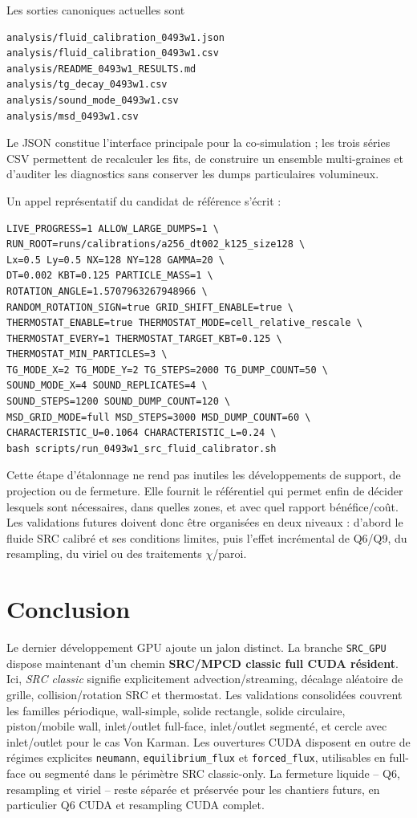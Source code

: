 \documentclass[11pt,a4paper]{article}
\begin{document}
Les sorties canoniques actuelles sont
\begin{verbatim}
analysis/fluid_calibration_0493w1.json
analysis/fluid_calibration_0493w1.csv
analysis/README_0493w1_RESULTS.md
analysis/tg_decay_0493w1.csv
analysis/sound_mode_0493w1.csv
analysis/msd_0493w1.csv
\end{verbatim}
Le JSON constitue l'interface principale pour la co-simulation ; les trois séries CSV permettent de recalculer les fits, de construire un ensemble multi-graines et d'auditer les diagnostics sans conserver les dumps particulaires volumineux.

Un appel représentatif du candidat de référence s'écrit :
\begin{verbatim}
LIVE_PROGRESS=1 ALLOW_LARGE_DUMPS=1 \
RUN_ROOT=runs/calibrations/a256_dt002_k125_size128 \
Lx=0.5 Ly=0.5 NX=128 NY=128 GAMMA=20 \
DT=0.002 KBT=0.125 PARTICLE_MASS=1 \
ROTATION_ANGLE=1.5707963267948966 \
RANDOM_ROTATION_SIGN=true GRID_SHIFT_ENABLE=true \
THERMOSTAT_ENABLE=true THERMOSTAT_MODE=cell_relative_rescale \
THERMOSTAT_EVERY=1 THERMOSTAT_TARGET_KBT=0.125 \
THERMOSTAT_MIN_PARTICLES=3 \
TG_MODE_X=2 TG_MODE_Y=2 TG_STEPS=2000 TG_DUMP_COUNT=50 \
SOUND_MODE_X=4 SOUND_REPLICATES=4 \
SOUND_STEPS=1200 SOUND_DUMP_COUNT=120 \
MSD_GRID_MODE=full MSD_STEPS=3000 MSD_DUMP_COUNT=60 \
CHARACTERISTIC_U=0.1064 CHARACTERISTIC_L=0.24 \
bash scripts/run_0493w1_src_fluid_calibrator.sh
\end{verbatim}

Cette étape d'étalonnage ne rend pas inutiles les développements de support, de projection ou de fermeture. Elle fournit le référentiel qui permet enfin de décider lesquels sont nécessaires, dans quelles zones, et avec quel rapport bénéfice/coût. Les validations futures doivent donc être organisées en deux niveaux : d'abord le fluide SRC calibré et ses conditions limites, puis l'effet incrémental de Q6/Q9, du resampling, du viriel ou des traitements $\chi$/paroi.


\section{Conclusion}


Le dernier développement GPU ajoute un jalon distinct. La branche \texttt{SRC\_GPU} dispose maintenant d'un chemin \textbf{SRC/MPCD classic full CUDA résident}. Ici, \emph{SRC classic} signifie explicitement advection/streaming, décalage aléatoire de grille, collision/rotation SRC et thermostat. Les validations consolidées couvrent les familles périodique, wall-simple, solide rectangle, solide circulaire, piston/mobile wall, inlet/outlet full-face, inlet/outlet segmenté, et cercle avec inlet/outlet pour le cas Von Karman. Les ouvertures CUDA disposent en outre de régimes explicites \texttt{neumann}, \texttt{equilibrium\_flux} et \texttt{forced\_flux}, utilisables en full-face ou segmenté dans le périmètre SRC classic-only. La fermeture liquide -- Q6, resampling et viriel -- reste séparée et préservée pour les chantiers futurs, en particulier Q6 CUDA et resampling CUDA complet.
\end{document}
